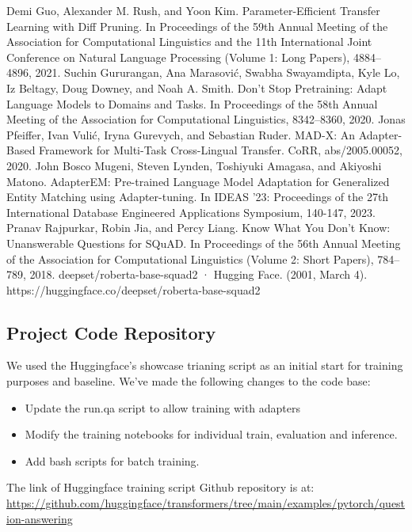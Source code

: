 \documentclass[conference]{IEEEtran}
\begin{document}
\begin{thebibliography}{00}
 Demi Guo, Alexander M. Rush, and Yoon Kim. Parameter-Efficient Transfer Learning with Diff Pruning. In Proceedings of the 59th Annual Meeting of the Association for Computational Linguistics and the 11th International Joint Conference on Natural Language Processing (Volume 1: Long Papers), 4884–4896, 2021.
 Suchin Gururangan, Ana Marasović, Swabha Swayamdipta, Kyle Lo, Iz Beltagy, Doug Downey, and Noah A. Smith. Don't Stop Pretraining: Adapt Language Models to Domains and Tasks. In Proceedings of the 58th Annual Meeting of the Association for Computational Linguistics, 8342–8360, 2020.
 Jonas Pfeiffer, Ivan Vulić, Iryna Gurevych, and Sebastian Ruder. MAD-X: An Adapter-Based Framework for Multi-Task Cross-Lingual Transfer. CoRR, abs/2005.00052, 2020.
 John Bosco Mugeni, Steven Lynden, Toshiyuki Amagasa, and Akiyoshi Matono. AdapterEM: Pre-trained Language Model Adaptation for Generalized Entity Matching using Adapter-tuning. In IDEAS '23: Proceedings of the 27th International Database Engineered Applications Symposium, 140-147, 2023.
 Pranav Rajpurkar, Robin Jia, and Percy Liang. Know What You Don't Know: Unanswerable Questions for SQuAD. In Proceedings of the 56th Annual Meeting of the Association for Computational Linguistics (Volume 2: Short Papers), 784–789, 2018.
 deepset/roberta-base-squad2 · Hugging Face. (2001, March 4). https://huggingface.co/deepset/roberta-base-squad2
\end{thebibliography}


\newpage
\subsection{Project Code Repository}

We used the Huggingface's showcase trianing script as an initial start for training purposes and baseline. We’ve made the following changes to the code base:

\begin{itemize}
    \item Update the run.qa script to allow training with adapters
    \item Modify the training notebooks for individual train, evaluation and inference.
    \item Add bash scripts for batch training.
\end{itemize}

The link of Huggingface training script Github repository is at: \url{https://github.com/huggingface/transformers/tree/main/examples/pytorch/question-answering}
\end{document}
